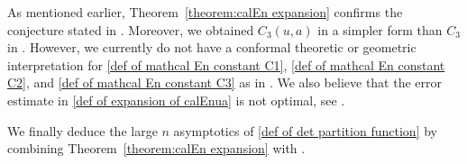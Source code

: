 \documentclass[reqno]{amsart}
\newcommand{\1}{\mathds{1}}
\numberwithin{equation}{section}
\newtheorem{remark}[theorem]{Remark}
\theoremstyle{definition}
\begin{document}

As mentioned earlier, Theorem~\ref{theorem:calEn expansion} confirms the conjecture stated in \cite[Remark~1.3]{BC2022}. 
Moreover, we obtained $C_3(u,a)$ in a simpler form than $C_3$ in \cite[Theorem~1.1]{BC2022}.
However, we currently do not have a conformal theoretic or geometric interpretation for \eqref{def of mathcal En constant C1}, \eqref{def of mathcal En constant C2}, and \eqref{def of mathcal En constant C3} as in \cite{ZW2006,BKS2023}.
We also believe that the error estimate in \eqref{def of expansion of calEnua} is not optimal, see \cite[Theorem~1.1 and Remark~1.2]{BC2022}.

\medskip

We finally deduce the large $n$ asymptotics of \eqref{def of det partition function} by combining Theorem~\ref{theorem:calEn expansion} with \cite[Theorem~1.4]{ACC2023c}.
\end{document}

